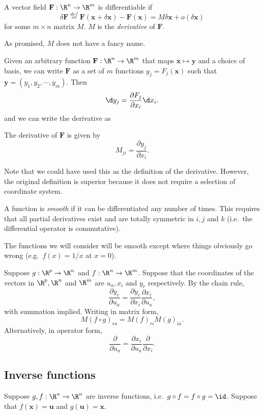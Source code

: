 \documentclass[a4paper]{article}
\begin{document}
\begin{defi}
  A vector field $\mathbf{F}: \R^n \to \R^m$ is differentiable if
  \[
    \delta \mathbf{F} \stackrel{def}{=} \mathbf{F}(\mathbf{x} + \delta\mathbf{x}) - \mathbf{F}(\mathbf{x}) = M\delta\mathbf{x} + o(\delta \mathbf{x})
  \]
  for some $m\times n$ matrix $M$. $M$ is the \emph{derivative} of $\mathbf{F}$.
\end{defi}
As promised, $M$ does not have a fancy name.

Given an arbitrary function $\mathbf{F}: \R^n \to \R^m$ that maps $\mathbf{x}\mapsto \mathbf{y}$ and a choice of basis, we can write $\mathbf{F}$ as a set of $m$ functions $y_j = F_j(\mathbf{x})$ such that $\mathbf{y} = (y_1, y_2, \cdots, y_m)$. Then
\[
  \d y_j = \frac{\partial F_j}{\partial x_i} \d x_i.
\]
and we can write the derivative as
\begin{thm}
  The derivative of $\mathbf{F}$ is given by
  \[
    M_{ji} =\frac{\partial y_j}{\partial x_i}.
  \]
\end{thm}
Note that we could have used this as the definition of the derivative. However, the original definition is superior because it does not require a selection of coordinate system.

\begin{defi}
  A function is \emph{smooth} if it can be differentiated any number of times. This requires that all partial derivatives exist and are totally symmetric in $i, j$ and $k$ (i.e.\ the differential operator is commutative).
\end{defi}
The functions we will consider will be smooth except where things obviously go wrong (e.g.\ $f(x) = 1/x$ at $x = 0$).

\begin{thm}
  Suppose $g: \R^p\to\R^n$ and $f: \R^n \to \R^m$. Suppose that the coordinates of the vectors in $\R^p, \R^n$ and $\R^m$ are $u_a, x_i$ and $y_r$ respectively. By the chain rule,
  \[
    \frac{\partial y_r}{\partial u_a} = \frac{\partial y_r}{\partial x_i}\frac{\partial x_i}{\partial u_a},
  \]
  with summation implied. Writing in matrix form,
  \[
    M(f\circ g)_{ra} = M(f)_{ri}M(g)_{ia}.
  \]
  Alternatively, in operator form,
  \[
    \frac{\partial}{\partial u_a} = \frac{\partial x_i}{\partial u_a}\frac{\partial}{\partial x_i}.
  \]
\end{thm}

\subsection{Inverse functions}
Suppose $g, f: \R^n \to \R^n$ are inverse functions, i.e.\ $g\circ f = f\circ g = \id$. Suppose that $f(\mathbf{x}) =\mathbf{u}$ and $g(\mathbf{u}) = \mathbf{x}$.
\end{document}
